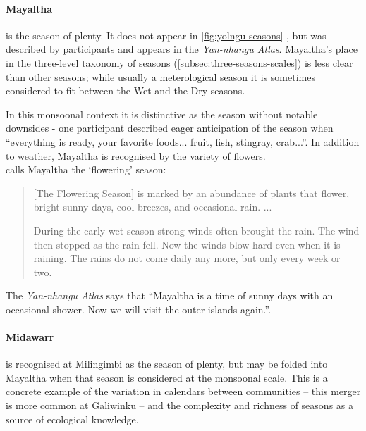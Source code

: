 \paragraph{Mayaltha} is the season of plenty.  It does not appear in
\cref{fig:yolngu-seasons} \citep{davis1989}, but was described by
participants and appears in the \textit{Yan-nhangu Atlas}.  Mayaltha's
place in the three-level taxonomy of seasons (\cref{subsec:three-seasons-scales})
is less clear than other seasons; while usually a meterological season
it is sometimes considered to fit between the Wet and the Dry seasons.

In this monsoonal context it is distinctive as the season without notable
downsides - one participant described eager anticipation of the season
when ``everything is ready, your favorite foods...  fruit, fish, stingray,
crab...''.  In addition to weather, Mayaltha is recognised by the variety
of flowers.\\

\citet{davis1989} calls Mayaltha the `flowering' season:
\begin{quote}
    [The Flowering Season] is marked by an abundance of plants that
    flower, bright sunny days, cool breezes, and occasional rain. ...

    During the early wet season strong winds often brought the rain.
    The wind then stopped as the rain fell.  Now the winds blow hard
    even when it is raining.  The rains do not come daily any more,
    but only every week or two.
\end{quote}

The \textit{Yan-nhangu Atlas} says that ``Mayaltha is a time of sunny days
with an occasional shower.  Now we will visit the outer islands again.''.


\paragraph{Midawarr} is recognised at Milingimbi as the season of plenty,
but may be folded into Mayaltha when that season is considered at the
monsoonal scale.  This is a concrete example of the variation in calendars
between communities -- this merger is more common at Galiwinku -- and the
complexity and richness of seasons as a source of ecological knowledge.


